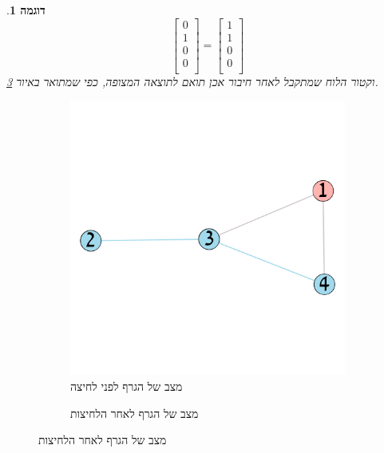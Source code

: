 \documentclass[12pt,leqno]{article}
\theoremstyle{theoremdd}
\newtheorem{example}{דוגמה}[section]
\begin{document}
\begin{example}
\[\begin{bmatrix}
            0 \\
            1 \\
            0 \\
            0 \\
        \end{bmatrix}
        =
        \begin{bmatrix}
            1 \\
            1 \\
            0 \\
            0 \\
        \end{bmatrix}
    \]
    וקטור הלוח שמתקבל לאחר חיבור אכן תואם לתוצאה המצופה,
    כפי שמתואר באיור 
    \ref{fig:start graph presses solution}.
\end{example}
\begin{figure}[ht]
    \caption{
        דוגמה לתיאור וקטור שינוי במהלך משחק על גרף
        }
    \label{fig: change vector on graph}
    \centering
    \begin{subfigure}[b]{.4\linewidth}
        \caption{מצב של הגרף לפני לחיצה}
        \label{fig:start graph presses}
        \centering
        \includegraphics[width=.7\textwidth,keepaspectratio]{images/graph_presses.png}
    \end{subfigure}
    \begin{subfigure}[b]{.4\linewidth}
        \caption{מצב של הגרף לאחר הלחיצות}
        \label{fig:start graph presses solution}
        \centering

\end{subfigure}
\end{figure}
\end{document}
